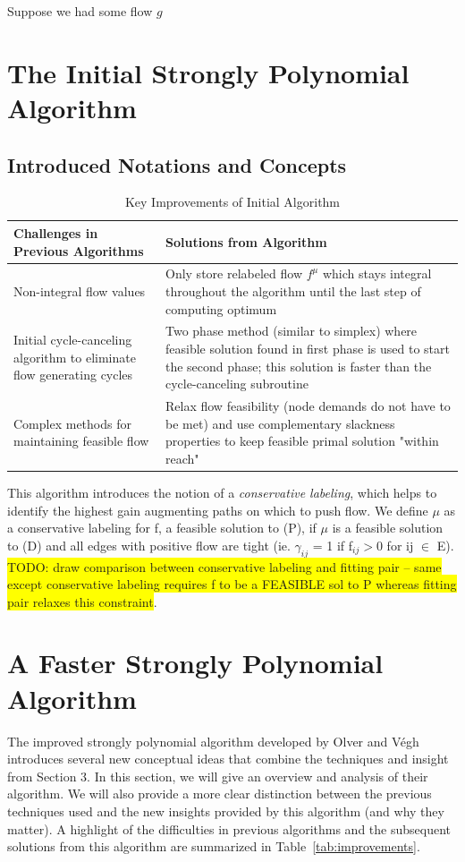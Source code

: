 \documentclass[12pt]{article}
\theoremstyle{definition}
\newcommand{\gij}{\gamma_{ij}}
\newcommand{\todo}[1]{\colorbox{yellow}{TODO: #1}}
\begin{document}
	Suppose we had some flow $g$
	

\section{The Initial Strongly Polynomial Algorithm}
\subsection{Introduced Notations and Concepts}

\begin{table}[H]
\begin{center}
    \begin{tabular}{ | p{7cm} | p{7cm} |}
    \hline
    Challenges in Previous Algorithms  & Solutions from Algorithm \\ \hline
    Non-integral flow values & Only store relabeled flow $f^{\mu}$ which stays integral throughout the algorithm until the last step of computing optimum \\ \hline
    Initial cycle-canceling algorithm to eliminate flow generating cycles & Two phase method (similar to simplex) where feasible solution found in first phase is used to start the second phase; this solution is faster than the cycle-canceling subroutine \\ \hline
    Complex methods for maintaining feasible flow & Relax flow feasibility (node demands do not have to be met) and use complementary slackness properties to keep feasible primal solution "within reach" \\
    \hline
    \end{tabular}
\end{center}
\caption{Key Improvements of Initial Algorithm}
\label{tab:improvementsInitial}
\end{table}
This algorithm introduces the notion of a \textit{conservative labeling}, which helps to identify the highest gain augmenting paths on which to push flow. We define $\mu$ as a conservative labeling for f, a feasible solution to (P), if $\mu$ is a feasible solution to (D) and all edges with positive flow are tight (ie. $\gij$ = 1 if f$_{ij} > 0$ for ij $\in$ E). \todo{draw comparison between conservative labeling and fitting pair -- same except conservative labeling requires f to be a FEASIBLE sol to P whereas fitting pair relaxes this constraint}. 
\section{A Faster Strongly Polynomial Algorithm} The improved strongly polynomial algorithm developed by Olver and Végh \cite{Olver2017} introduces several new conceptual ideas that combine the techniques and insight from Section 3. In this section, we will give an overview and analysis of their algorithm. We will also provide a more clear distinction between the previous techniques used and the new insights provided by this algorithm (and why they matter). A highlight of the difficulties in previous algorithms and the subsequent solutions from this algorithm are summarized in Table~\ref{tab:improvements}.
\end{document}
